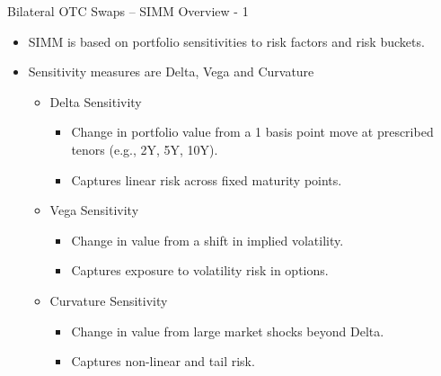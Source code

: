 \documentclass[handout, aspectratio=169]{beamer}
\begin{document}
\begin{frame}{Bilateral OTC Swaps – SIMM Overview - 1}
  \begin{itemize}
    \item SIMM is based on portfolio sensitivities to risk factors and risk buckets.
    \item Sensitivity measures are Delta, Vega and Curvature
      \begin{itemize}
          \item Delta Sensitivity
          \begin{itemize}
            \item Change in portfolio value from a 1 basis point move at prescribed tenors (e.g., 2Y, 5Y, 10Y).  
            \item Captures linear risk across fixed maturity points.
          \end{itemize}
          \item Vega Sensitivity
          \begin{itemize}
            \item Change in value from a shift in implied volatility.  
            \item Captures exposure to volatility risk in options.
          \end{itemize}
          \item Curvature Sensitivity
          \begin{itemize}
            \item Change in value from large market shocks beyond Delta.  
            \item Captures non-linear and tail risk.
        \end{itemize}
      \end{itemize}
  \end{itemize}
\end{frame}
\end{document}
